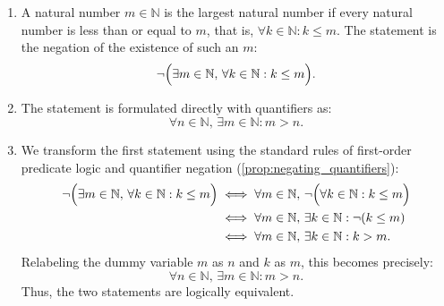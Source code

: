 \begin{exercisesolution}
\label{sol:first_order_logic_naturals}
\begin{enumerate}[label=\textbf{(\alph*)}]
    \item A natural number $m \in \mathbb{N}$ is the largest natural number if every natural number is less than or equal to $m$, that is, $\forall k \in \mathbb{N} : k \le m$. The statement  is the negation of the existence of such an $m$:
    \[
    \neg \Bigl( \exists m \in \mathbb{N}, \, \forall k \in \mathbb{N} : k \le m \Bigr).
    \]

    \item The statement  is formulated directly with quantifiers as:
    \[
    \forall n \in \mathbb{N}, \, \exists m \in \mathbb{N} : m > n.
    \]

    \item We transform the first statement using the standard rules of first-order predicate logic and quantifier negation (\cref{prop:negating_quantifiers}):
    \begin{align*}
    \neg \Bigl( \exists m \in \mathbb{N}, \, \forall k \in \mathbb{N} : k \le m \Bigr) &\iff \forall m \in \mathbb{N}, \, \neg \Bigl( \forall k \in \mathbb{N} : k \le m \Bigr) \\
    &\iff \forall m \in \mathbb{N}, \, \exists k \in \mathbb{N} : \neg(k \le m) \\
    &\iff \forall m \in \mathbb{N}, \, \exists k \in \mathbb{N} : k > m.
    \end{align*}
    Relabeling the dummy variable $m$ as $n$ and $k$ as $m$, this becomes precisely:
    \[
    \forall n \in \mathbb{N}, \, \exists m \in \mathbb{N} : m > n.
    \]
    Thus, the two statements are logically equivalent.
\end{enumerate}
\end{exercisesolution}


